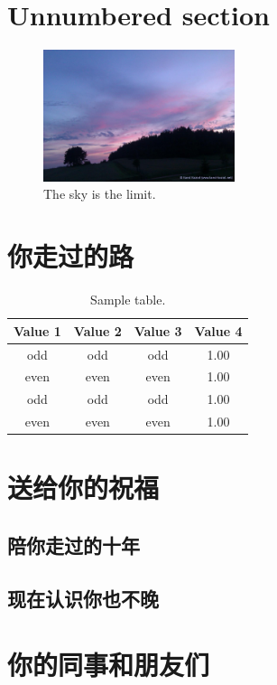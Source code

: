\documentclass[12pt]{ctexart}
\begin{document}
\section*{Unnumbered section}
\lipsum[1]

\begin{figure}[!h]
\centering
\includegraphics[width=0.5\textwidth]{sky.jpg}
\caption*{The sky is the limit.}
\end{figure}

\newpage

\section{你走过的路}

\lipsum[1]
\begin{table}[!h]
\centering
\caption{Sample table.}
\begin{tabular}{cccc}
\toprule
Value 1 & Value 2 & Value 3 & Value 4\\
\midrule
 odd     & odd   & odd & 1.00 \\
 even    & even  & even& 1.00 \\
 odd     & odd   & odd & 1.00 \\
 even    & even  & even& 1.00 \\
\bottomrule
\end{tabular}
\end{table}

\lipsum[1]

\lipsum[1]
\frameboxend
\section{送给你的祝福}

\subsection{陪你走过的十年}
\subsection{现在认识你也不晚}

\section{你的同事和朋友们}
\end{document}
